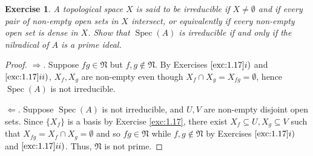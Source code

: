 \documentclass[12pt,letterpaper]{article}
\newtheorem{problem}{Exercise}[section]
\theoremstyle{definition}
\theoremstyle{remark}
\numberwithin{figure}{problem}
\numberwithin{equation}{section}
\DeclareMathOperator{\Spec}{Spec}
\begin{document}
\begin{problem}\label{exc:1.19}
  A topological space
  $X$ is said to be \emph{irreducible} if
  $X \ne
  \emptyset$ and if every pair of non-empty open sets in
  $X$ intersect, or equivalently if every non-empty open set is dense in
  $X$.
  Show that
  $\Spec(A)$ is irreducible if and only if the nilradical of
  $A$ is a prime ideal.
\end{problem}
\begin{proof}
  $\Rightarrow$.
  Suppose
  $fg \in
  \mathfrak{N}$ but
  $f,g \notin
  \mathfrak{N}$.
  By Exercises
  $\ref{exc:1.17}i)$ and
  $\ref{exc:1.17}ii)$,
  $X_f,X_g$ are non-empty even though
  $X_f \cap X_g = X_{fg} =
  \emptyset$, hence
  $\Spec(A)$ is not irreducible.
  \par
  $\Leftarrow$.
  Suppose
  $\Spec(A)$ is not irreducible, and
  $U,V$ are non-empty disjoint open sets.
  Since
  $\{X_f\}$ is a basis by Exercise \ref{exc:1.17}, there exist
  $X_f \subseteq U,X_g \subseteq
  V$ such that
  $X_{fg} = X_f \cap X_g =
  \emptyset$ and so
  $fg \in
  \mathfrak{N}$ while
  $f,g \notin
  \mathfrak{N}$ by Exercises
  $\ref{exc:1.17}i)$ and
  $\ref{exc:1.17}ii)$.
  Thus,
  $\mathfrak{N}$ is not prime.
\end{proof}
\end{document}

